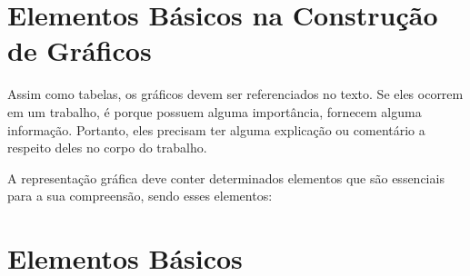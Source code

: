 \section{Elementos  Básicos na Construção de Gráficos}

\inic Assim como tabelas, os gráficos devem ser referenciados no texto. Se eles ocorrem em um trabalho, é porque possuem alguma importância, fornecem alguma informação. Portanto, eles precisam ter alguma explicação ou comentário a respeito deles no corpo do trabalho.\vskip0.3cm 

\inic A representação gráfica deve conter determinados elementos que são essenciais para a sua compreensão, sendo esses elementos:

\section{Elementos Básicos}

